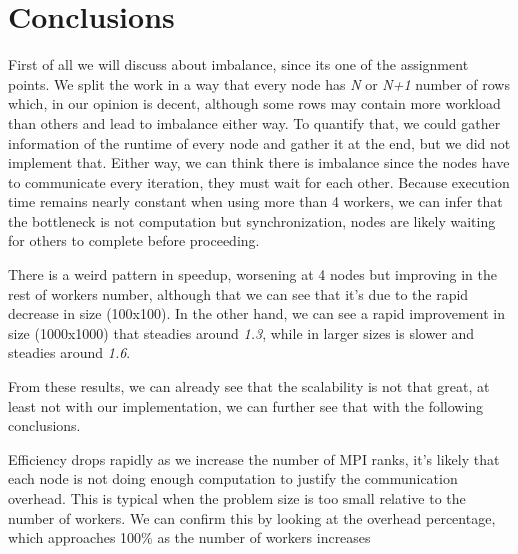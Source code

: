 \documentclass[../main.tex]{subfiles}
\begin{document}
\section{Conclusions}

First of all we will discuss about imbalance, since its one of the assignment points. We split the work in a way that every node has \textit{N} or \textit{N+1} number of rows which, in our opinion is decent, although some rows may contain more workload than others and lead to imbalance either way.
To quantify that, we could gather information of the runtime of every node and gather it at the end, but we did not implement that. Either way, we can think there is imbalance since the nodes have to communicate every iteration, they must wait for each other. Because execution time remains nearly constant when using more than 4 workers, we can infer that the bottleneck is not computation but synchronization, nodes are likely waiting for others to complete before proceeding.


There is a weird pattern in speedup, worsening at 4 nodes but improving in the rest of workers number, although that we can see that it's due to the rapid decrease in size (100x100).
In the other hand, we can see a rapid improvement in size (1000x1000) that steadies around \textit{1.3}, while in larger sizes is slower and steadies around \textit{1.6}.


From these results, we can already see that the scalability is not that great, at least not with our implementation, we can further see that with the following conclusions.

Efficiency drops rapidly as we increase the number of MPI ranks, it's likely that each node is not doing enough computation to justify the communication overhead. This is typical when the problem size is too small relative to the number of workers.
We can confirm this by looking at the overhead percentage, which approaches 100\% as the number of workers increases
\end{document}
